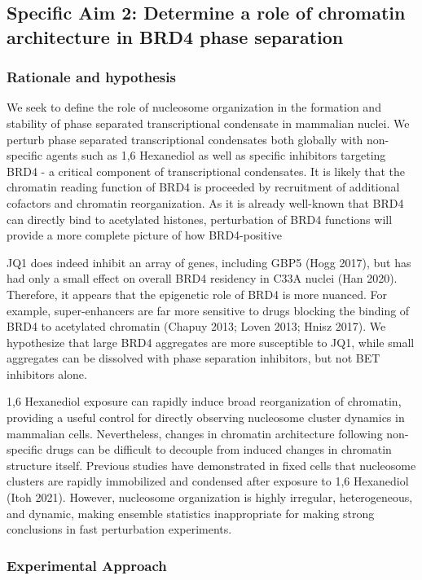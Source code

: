 \documentclass{ucetd}
\begin{document}
\subsection{Specific Aim 2: Determine a role of chromatin architecture in BRD4 phase separation}

\subsubsection{Rationale and hypothesis}

We seek to define the role of nucleosome organization in the formation and stability of phase separated transcriptional condensate in mammalian nuclei. We perturb phase separated transcriptional condensates both globally with non-specific agents such as 1,6 Hexanediol as well as specific inhibitors targeting BRD4 - a critical component of transcriptional condensates. It is likely that the chromatin reading function of BRD4 is proceeded by recruitment of additional cofactors and chromatin reorganization. As it is already well-known that BRD4 can directly bind to acetylated histones, perturbation of BRD4 functions will provide a more complete picture of how BRD4-positive 


JQ1 does indeed inhibit an array of genes, including GBP5 (Hogg 2017), but has had only a small effect on overall BRD4 residency in C33A nuclei (Han 2020). Therefore, it appears that the epigenetic role of BRD4 is more nuanced. For example, super-enhancers are far more sensitive to drugs blocking the binding of BRD4 to acetylated chromatin (Chapuy 2013; Loven 2013; Hnisz 2017). We hypothesize that large BRD4 aggregates are more susceptible to JQ1, while small aggregates can be dissolved with phase separation inhibitors, but not BET inhibitors alone.

1,6 Hexanediol exposure can rapidly induce broad reorganization of chromatin, providing a useful control for directly observing nucleosome cluster dynamics in mammalian cells. Nevertheless, changes in chromatin architecture following non-specific drugs can be difficult to decouple from induced changes in chromatin structure itself. Previous studies have demonstrated in fixed cells that nucleosome clusters are rapidly immobilized and condensed after exposure to 1,6 Hexanediol (Itoh 2021). However, nucleosome organization is highly irregular, heterogeneous, and dynamic, making ensemble statistics inappropriate for making strong conclusions in fast perturbation experiments. 

\subsubsection{Experimental Approach}
\end{document}
